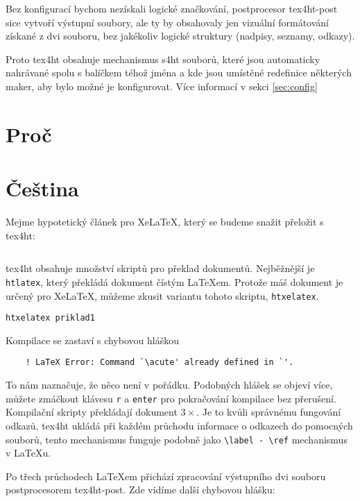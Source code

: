 \documentclass{article}
\begin{document}
Bez konfigurací bychom nezískali logické značkování, postprocesor \gls{tex4ht-post} sice vytvoří výstupní soubory, ale ty by obsahovaly jen vizuální formátování získané z dvi souboru, bez jakékoliv logické struktury
(nadpisy, seznamy, odkazy).

Proto \gls{tex4ht} obsahuje mechanismus \gls{s4ht} souborů, které jsou 
automaticky nahrávané spolu s balíčkem téhož jména a kde jsou umístěné 
redefinice některých maker, aby bylo možné je konfigurovat. Více informací 
v sekci \ref{sec:config}

\section{Proč }

\section{Čeština}

Mejme hypotetický článek pro Xe\LaTeX, který se budeme snažit přeložit s \gls{tex4ht}:

\inputminted{latex}{priklady/priklad1.tex}

\gls{tex4ht} obsahuje množství skriptů pro překlad dokumentů. Nejběžnější 
je \verb|htlatex|, který překládá dokument čístým \LaTeX em. Protože máš 
dokument je určený pro Xe\LaTeX, můžeme zkusit variantu tohoto skriptu,
\verb|htxelatex|. 

\begin{verbatim}
htxelatex priklad1
\end{verbatim}

Kompilace se zastaví s chybovou hláškou

\begin{verbatim}
	! LaTeX Error: Command `\acute' already defined in `'.
\end{verbatim}

To nám naznačuje, že něco není v pořádku. Podobných hlášek se objeví více,
můžete zmáčkout klávesu \verb|r| a \verb|enter| pro pokračování kompilace bez 
přerušení. Kompilační skripty překládají dokument \(3 \times\). 
Je to kvůli správnému fungování odkazů, \gls{tex4ht} ukládá při každém průchodu
informace o odkazech do pomocných souborů, tento mechanismus funguje
podobně jako \verb|\label - \ref| mechanismus v \LaTeX{}u.

Po třech průchodech \LaTeX em přichází zpracování výstupního \gls{dvi} 
souboru postprocesorem \gls{tex4ht-post}. Zde vidíme další chybovou hlášku:
\end{document}
